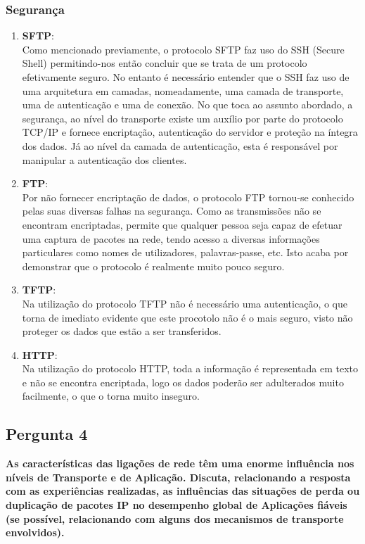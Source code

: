 \documentclass[11pt]{article}
\begin{document}
\subsubsection{Segurança}
\begin{enumerate}
  \item \textbf{SFTP}:\\
  Como mencionado previamente, o protocolo SFTP faz uso do SSH (Secure Shell) permitindo-nos então concluir que se trata de um protocolo efetivamente seguro. No entanto é necessário entender que o SSH faz uso de uma arquitetura em camadas, nomeadamente, uma camada de transporte, uma de autenticação e uma de conexão. No que toca ao assunto abordado, a segurança, ao nível do transporte existe um auxílio por parte do protocolo TCP/IP e fornece encriptação, autenticação do servidor e proteção na íntegra dos dados. Já ao nível da camada de autenticação, esta é responsável por manipular a autenticação dos clientes.
  \item \textbf{FTP}:\\
  Por não fornecer encriptação de dados, o protocolo FTP tornou-se conhecido pelas suas diversas falhas na segurança. Como as transmissões não se encontram encriptadas, permite que qualquer pessoa seja capaz de efetuar uma captura de pacotes na rede, tendo acesso a diversas informações particulares como nomes de utilizadores, palavras-passe, etc. Isto acaba por demonstrar que o protocolo é realmente muito pouco seguro.
  \item \textbf{TFTP}:\\
  Na utilização do protocolo TFTP não é necessário uma autenticação, o que torna de imediato evidente que este procotolo não é o mais seguro, visto não proteger os dados que estão a ser transferidos.
\clearpage
  \item \textbf{HTTP}:\\
  Na utilização do protocolo HTTP, toda a informação é representada em texto e não se encontra encriptada, logo os dados poderão ser adulterados muito facilmente, o que o torna muito inseguro.
\end{enumerate}


\vspace{0.5cm}
\subsection{Pergunta 4}

\textbf{As características das ligações de rede têm uma enorme influência nos níveis de Transporte e de Aplicação. Discuta, relacionando a resposta com as experiências realizadas, as influências das situações de perda ou duplicação de pacotes IP no desempenho global de Aplicações fiáveis (se possível, relacionando com alguns dos mecanismos de transporte envolvidos).}
\end{document}
